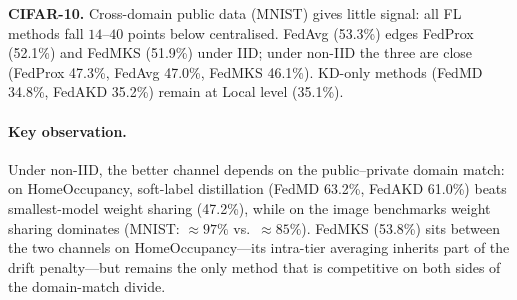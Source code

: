 \documentclass[conference]{IEEEtran}
\begin{document}
\textbf{CIFAR-10.}
Cross-domain public data (MNIST) gives little signal: all FL methods fall
$14$--$40$ points below centralised.  FedAvg (53.3\%) edges FedProx (52.1\%)
and FedMKS (51.9\%) under IID; under non-IID the three are close
(FedProx 47.3\%, FedAvg 47.0\%, FedMKS 46.1\%).  KD-only methods
(FedMD 34.8\%, FedAKD 35.2\%) remain at Local level (35.1\%).

\paragraph{Key observation.}
Under non-IID, the better channel depends on the public--private domain
match: on HomeOccupancy, soft-label distillation (FedMD 63.2\%, FedAKD
61.0\%) beats smallest-model weight sharing (47.2\%), while on the
image benchmarks weight sharing dominates (MNIST: ${\approx}97\%$ vs.\
${\approx}85\%$).  FedMKS (53.8\%) sits between the two channels on
HomeOccupancy---its intra-tier averaging inherits part of the drift
penalty---but remains the only method that is competitive on both sides
of the domain-match divide.
\end{document}
